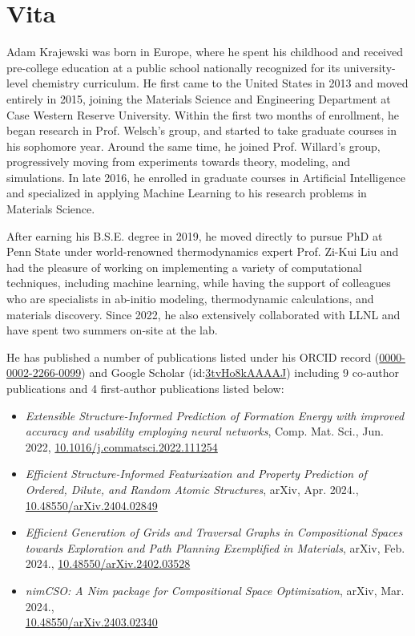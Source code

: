 \documentclass[letterpaper, 12pt]{report}
\begin{document}
\newpage
\chapter*{Vita}
\thispagestyle{empty}

Adam Krajewski was born in Europe, where he spent his childhood and received pre-college education at a public school nationally recognized for its university-level chemistry curriculum. He first came to the United States in 2013 and moved entirely in 2015, joining the Materials Science and Engineering Department at Case Western Reserve University. Within the first two months of enrollment, he began research in Prof. Welsch's group, and started to take graduate courses in his sophomore year. Around the same time, he joined Prof. Willard's group, progressively moving from experiments towards theory, modeling, and simulations. In late 2016, he enrolled in graduate courses in Artificial Intelligence and specialized in applying Machine Learning to his research problems in Materials Science. 

After earning his B.S.E. degree in 2019, he moved directly to pursue PhD at Penn State under world-renowned thermodynamics expert Prof. Zi-Kui Liu and had the pleasure of working on implementing a variety of computational techniques, including machine learning, while having the support of colleagues who are specialists in ab-initio modeling, thermodynamic calculations, and materials discovery. Since 2022, he also extensively collaborated with LLNL and have spent two summers on-site at the lab.

He has published a number of publications listed under his ORCID record (\href{https://orcid.org/0000-0002-2266-0099}{0000-0002-2266-0099}) and Google Scholar (id:\href{https://scholar.google.com/citations?user=3tvHo8kAAAAJ}{3tvHo8kAAAAJ}) including 9 co-author publications and 4 first-author publications listed below:
\begin{itemize}


    \item \textit{Extensible Structure-Informed Prediction of Formation Energy with improved accuracy and usability employing neural networks}, Comp. Mat. Sci., Jun. 2022, \href{https://doi.org/10.1016/j.commatsci.2022.111254}{10.1016/j.commatsci.2022.111254}


    \item \textit{Efficient Structure-Informed Featurization and Property Prediction of Ordered, Dilute, and Random Atomic Structures}, arXiv, Apr. 2024., \href{https://doi.org/10.48550/arXiv.2404.02849}{10.48550/arXiv.2404.02849} 


    \item \textit{Efficient Generation of Grids and Traversal Graphs in Compositional Spaces towards Exploration and Path Planning Exemplified in Materials}, arXiv, Feb. 2024., \href{https://doi.org/10.48550/arXiv.2402.03528}{10.48550/arXiv.2402.03528}

    \item \textit{nimCSO: A Nim package for Compositional Space Optimization}, arXiv, Mar. 2024.,\\ \href{https://doi.org/10.48550/arXiv.2403.02340}{10.48550/arXiv.2403.02340}
    
\end{itemize}
\end{document}
